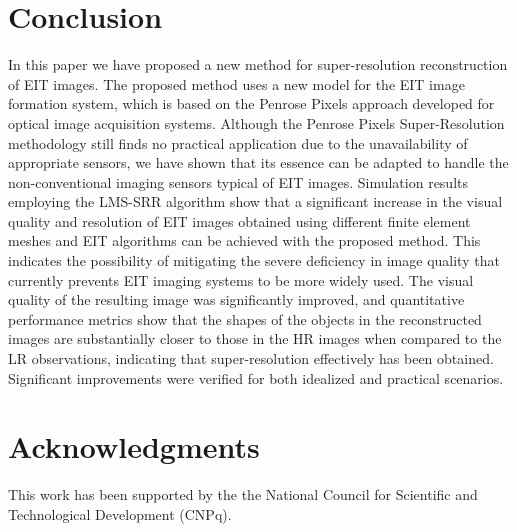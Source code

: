\documentclass[10pt]{IEEEtran}
\begin{document}
\section{Conclusion}
\label{sec:conclusions}

In this paper we have proposed a new method for super-resolution reconstruction of EIT images. The proposed method uses a new model for the EIT image formation system, which is based on the Penrose Pixels approach developed for optical image acquisition systems. Although the Penrose Pixels Super-Resolution methodology still finds no practical application due to the unavailability of appropriate sensors, we have shown that its essence can be adapted to handle the non-conventional imaging sensors typical of EIT images.
%
Simulation results employing the LMS-SRR algorithm show that a significant increase in the visual quality and resolution of EIT images obtained using different finite element meshes and EIT algorithms can be achieved with the proposed method. This indicates the possibility of mitigating the severe deficiency in image quality that currently prevents EIT imaging systems to be more widely used.
%
The visual quality of the resulting image was significantly improved, and quantitative performance metrics show that the shapes of the objects in the reconstructed images are substantially closer to those in the HR images when compared to the LR observations, indicating that super-resolution effectively has been obtained. Significant improvements were verified for both idealized and practical scenarios.





\section*{Acknowledgments}
This work has been supported by the the National Council for Scientific and Technological Development (CNPq).







\end{document}
